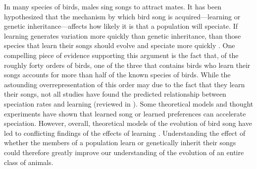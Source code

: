 \documentclass[12pt]{article}
\begin{document}
In many species of birds, males sing songs to attract mates. It has been hypothesized that the mechanism by which bird song is acquired---learning or genetic inheritance---affects how likely it is that a population will speciate. If learning generates variation more quickly than genetic inheritance, than those species that learn their songs should evolve and speciate more quickly \cite{Beecher:2005ly}. One compelling piece of evidence supporting this argument is the fact that, of the roughly forty orders of birds, one of the three that contains birds who learn their songs accounts for more than half of the known species of birds. While the astounding overrepresentation of this order may due to the fact that they learn their songs, not all studies have found the predicted relationship between speciation rates and learning (reviewed in \cite{Wilkins:2012ve,Lachlan:2004tg}).  Some theoretical models and thought experiments have shown that learned song \cite{Lachlan:2004tg,Irwin:2012hc} or learned preferences \cite{Gilman:2015fk,Servedio:2013uq,Bailey:2012kx,Irwin:1999fk} can accelerate speciation. However, overall, theoretical models of the evolution of bird song have led to conflicting findings of the effects of learning \cite{Verzijden:2012uq}. Understanding the effect of whether the members of a population learn or genetically inherit their songs could therefore greatly improve our understanding of the evolution of an entire class of animals.
\end{document}
